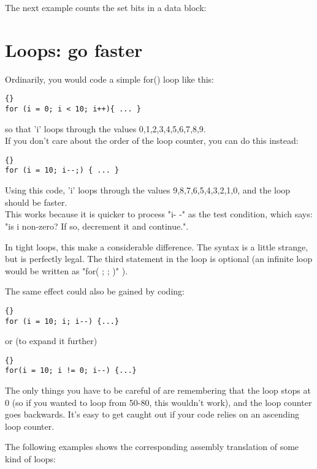 \documentclass{report}
\begin{document}
The next example counts the set bits in a data block:



\section{Loops: go faster}
Ordinarily, you would code a simple for() loop like this: 
\begin{lstlisting}{}
for (i = 0; i < 10; i++){ ... }
\end{lstlisting}
so that 'i' loops through the values 0,1,2,3,4,5,6,7,8,9.\\
If you don't care about the order of the loop counter, you can do this instead: 
\begin{lstlisting}{}
for (i = 10; i--;) { ... }
\end{lstlisting}
Using this code, 'i' loops through the values 9,8,7,6,5,4,3,2,1,0, and the loop should be faster.\\ 
This works because it is quicker to process "i- -" as the test condition, which says: "is i non-zero? If so, decrement it and continue.".

In tight loops, this make a considerable difference. The syntax is a little strange, but is perfectly legal. The third statement in the loop is optional (an infinite loop would be written as "for( ; ; )" ).

The same effect could also be gained by coding: 
\begin{lstlisting}{}
for (i = 10; i; i--) {...}
\end{lstlisting}
or (to expand it further) 
\begin{lstlisting}{}
for(i = 10; i != 0; i--) {...}
\end{lstlisting}
The only things you have to be careful of are remembering that the loop stops at 0 (so if you wanted to loop from 50-80, this wouldn't work), and the loop counter goes backwards. It's easy to get caught out if your code relies on an ascending loop counter.

The following examples shows the corresponding assembly translation of some kind of loops:
\end{document}
